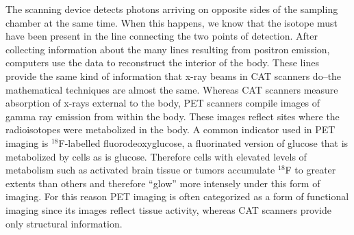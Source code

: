 The scanning device detects photons arriving on opposite sides of the sampling chamber at the same time.  When this happens, we know that the isotope must have been present in the line connecting the two points of detection.  After collecting information about the many lines resulting from positron emission, computers use the data to reconstruct the interior of the body.  These lines provide the same kind of information that x-ray beams in CAT scanners do--the mathematical techniques are almost the same.  Whereas CAT scanners measure absorption of x-rays external to the body, PET scanners compile images of gamma ray emission from within the body. These images reflect sites where the radioisotopes were metabolized in the body. A common indicator used in PET imaging is $^{18}$F-labelled fluorodeoxyglucose, a fluorinated version of glucose that is metabolized by cells as is glucose. Therefore cells with elevated levels of metabolism  such as activated brain tissue or tumors accumulate $^{18}$F to greater extents than others and therefore ``glow'' more intensely under this form of imaging. For this reason PET imaging is often categorized as a form of functional imaging since its images reflect tissue activity, whereas CAT scanners provide only structural information.

